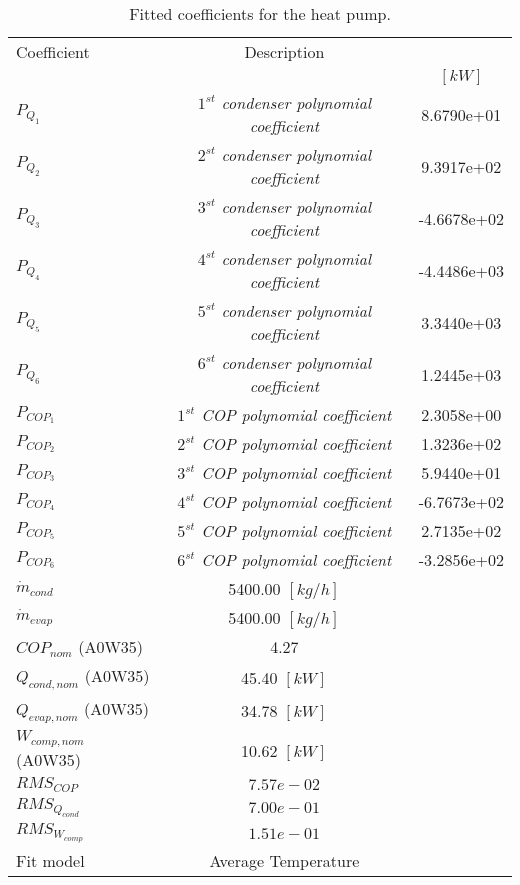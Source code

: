\documentclass[english]{SPFShortReport}
\author{Dani Carbonell}
\begin{document}
\begin{table}[!ht]
\begin{small}
\caption{Fitted coefficients for the heat pump.}
\begin{center}
\resizebox{12cm}{!} 
{
\begin{tabular}{l | c c } 
\hline
\hline
Coefficient &Description & \\ 
 & &$[kW]$\\ 
\hline
$P_{Q_{1}}$ & \emph{$1^{st}$ condenser polynomial coefficient}  & 8.6790e+01    \\ 
$P_{Q_{2}}$ & \emph{$2^{st}$ condenser polynomial coefficient}  & 9.3917e+02    \\ 
$P_{Q_{3}}$ & \emph{$3^{st}$ condenser polynomial coefficient}  & -4.6678e+02    \\ 
$P_{Q_{4}}$ & \emph{$4^{st}$ condenser polynomial coefficient}  & -4.4486e+03    \\ 
$P_{Q_{5}}$ & \emph{$5^{st}$ condenser polynomial coefficient}  & 3.3440e+03    \\ 
$P_{Q_{6}}$ & \emph{$6^{st}$ condenser polynomial coefficient}  & 1.2445e+03    \\ 
\hline
$P_{COP_{1}}$ & \emph{$1^{st}$ COP polynomial coefficient}  & 2.3058e+00    \\ 
$P_{COP_{2}}$ & \emph{$2^{st}$ COP polynomial coefficient}  & 1.3236e+02    \\ 
$P_{COP_{3}}$ & \emph{$3^{st}$ COP polynomial coefficient}  & 5.9440e+01    \\ 
$P_{COP_{4}}$ & \emph{$4^{st}$ COP polynomial coefficient}  & -6.7673e+02    \\ 
$P_{COP_{5}}$ & \emph{$5^{st}$ COP polynomial coefficient}  & 2.7135e+02    \\ 
$P_{COP_{6}}$ & \emph{$6^{st}$ COP polynomial coefficient}  & -3.2856e+02    \\ 
\hline
$\dot m_{cond}$ & 5400.00 $[kg/h]$ \\ 
$\dot m_{evap}$ & 5400.00 $[kg/h]$ \\ 
\hline
$COP_{nom}$ (A0W35)& 4.27 \\ 
$Q_{cond,nom}$ (A0W35)& 45.40 $[kW]$\\ 
$Q_{evap,nom}$ (A0W35)& 34.78 $[kW]$\\ 
$W_{comp,nom}$ (A0W35)& 10.62 $[kW]$\\ 
\hline
 $RMS_{COP}$ & $7.57e-02$ \\ 
 $RMS_{Q_{cond}}$ & $7.00e-01$ \\ 
 $RMS_{W_{comp}}$ & $1.51e-01$ \\ 
\hline
Fit model & Average Temperature\\ 
\hline
\hline
\end{tabular}
}
\label{CoefTable}
\end{center}
\end{small}
\end{table}
\end{document}
